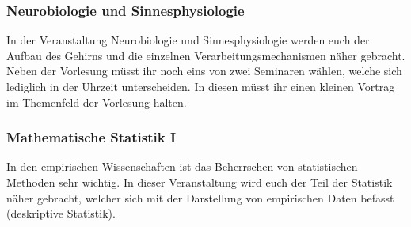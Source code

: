 \subsubsection*{Neurobiologie und Sinnesphysiologie}
In der Veranstaltung Neurobiologie und Sinnesphysiologie werden euch der Aufbau des Gehirns und die einzelnen Verarbeitungsmechanismen näher gebracht. Neben der Vorlesung müsst ihr noch eins von zwei Seminaren wählen, welche sich lediglich in der Uhrzeit unterscheiden. In diesen müsst ihr einen kleinen Vortrag im Themenfeld der Vorlesung halten.

\subsubsection*{Mathematische Statistik I}
In den empirischen Wissenschaften ist das Beherrschen von statistischen Methoden sehr wichtig. In dieser Veranstaltung wird euch der Teil der Statistik näher gebracht, welcher sich mit der Darstellung von empirischen Daten befasst (deskriptive Statistik). 

